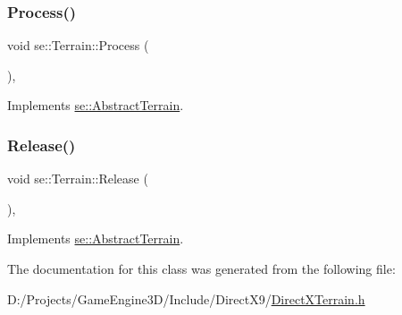 \mbox{\label{classse_1_1_terrain_aa4eeb1886f46d2f33e1633b6f7c7345c}} 
\subsubsection{\texorpdfstring{Process()}{Process()}}
{\footnotesize\ttfamily void se\+::\+Terrain\+::\+Process (\begin{DoxyParamCaption}{ }\end{DoxyParamCaption})\hspace{0.3cm}{\ttfamily [override]}, {\ttfamily [virtual]}}



Implements \mbox{\hyperlink{classse_1_1_abstract_terrain_af2f0249eead2b62a82baa2ecbb52efeb}{se\+::\+Abstract\+Terrain}}.

\mbox{\label{classse_1_1_terrain_a61004e3426795d93190fe8d1f4159759}} 
\subsubsection{\texorpdfstring{Release()}{Release()}}
{\footnotesize\ttfamily void se\+::\+Terrain\+::\+Release (\begin{DoxyParamCaption}{ }\end{DoxyParamCaption})\hspace{0.3cm}{\ttfamily [override]}, {\ttfamily [virtual]}}



Implements \mbox{\hyperlink{classse_1_1_abstract_terrain_aeee5b6c81be6aee211819b8d79718bf5}{se\+::\+Abstract\+Terrain}}.



The documentation for this class was generated from the following file\+:\begin{DoxyCompactItemize}
\item 
D\+:/\+Projects/\+Game\+Engine3\+D/\+Include/\+Direct\+X9/\mbox{\hyperlink{_direct_x_terrain_8h}{Direct\+X\+Terrain.\+h}}\end{DoxyCompactItemize}
